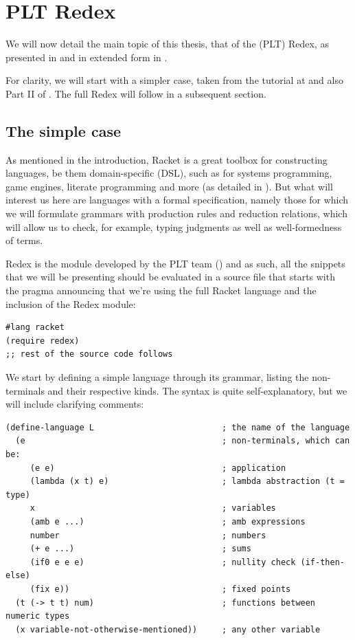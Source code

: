 \chapter{PLT Redex}

We will now detail the main topic of this thesis, that of the (PLT) Redex,
as presented in \cite{popl} and in extended form in \cite{sewpr}.

For clarity, we will start with a simpler case, taken from the tutorial
at \cite{amb} and also Part II of \cite{sewpr}. The full Redex will follow
in a subsequent section.

\section{The simple case}

As mentioned in the introduction, Racket is a great toolbox for constructing
languages, be them domain-specific (DSL), such as for systems programming,
game engines, literate programming and more (as detailed in \cite{racket}).
But what will interest us here are languages with a formal specification,
namely those for which we will formulate grammars with production rules
and reduction relations, which will allow us to check, for example, typing
judgments as well as well-formedness of terms.

Redex is the module developed by the PLT team (\cite{pltgrp}) and as such,
all the snippets that we will be presenting should be evaluated in a source
file that starts with the pragma announcing that we're using the full
Racket language and the inclusion of the Redex module:
{
  \small
\begin{verbatim}
#lang racket
(require redex)
;; rest of the source code follows
\end{verbatim}
}

We start by defining a simple language through its grammar, listing the
non-terminals and their respective kinds. The syntax is quite self-explanatory,
but we will include clarifying comments:
{
  \small
\begin{verbatim}
(define-language L                          ; the name of the language
  (e                                        ; non-terminals, which can be:
     (e e)                                  ; application
     (lambda (x t) e)                       ; lambda abstraction (t = type)
     x                                      ; variables
     (amb e ...)                            ; amb expressions
     number                                 ; numbers
     (+ e ...)                              ; sums
     (if0 e e e)                            ; nullity check (if-then-else)
     (fix e))                               ; fixed points
  (t (-> t t) num)                          ; functions between numeric types
  (x variable-not-otherwise-mentioned))     ; any other variable
\end{verbatim}
}

